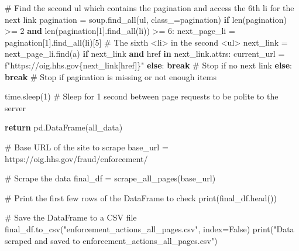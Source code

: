 \documentclass[
  letterpaper,
  DIV=11,
  numbers=noendperiod]{scrartcl}
\newenvironment{Shaded}{\begin{snugshade}}{\end{snugshade}}
\newcommand{\BuiltInTok}[1]{\textcolor[rgb]{0.00,0.23,0.31}{#1}}
\newcommand{\CommentTok}[1]{\textcolor[rgb]{0.37,0.37,0.37}{#1}}
\newcommand{\ControlFlowTok}[1]{\textcolor[rgb]{0.00,0.23,0.31}{\textbf{#1}}}
\newcommand{\DecValTok}[1]{\textcolor[rgb]{0.68,0.00,0.00}{#1}}
\newcommand{\KeywordTok}[1]{\textcolor[rgb]{0.00,0.23,0.31}{\textbf{#1}}}
\newcommand{\NormalTok}[1]{\textcolor[rgb]{0.00,0.23,0.31}{#1}}
\newcommand{\OperatorTok}[1]{\textcolor[rgb]{0.37,0.37,0.37}{#1}}
\newcommand{\SpecialCharTok}[1]{\textcolor[rgb]{0.37,0.37,0.37}{#1}}
\newcommand{\SpecialStringTok}[1]{\textcolor[rgb]{0.13,0.47,0.30}{#1}}
\newcommand{\StringTok}[1]{\textcolor[rgb]{0.13,0.47,0.30}{#1}}
\newcommand{\VariableTok}[1]{\textcolor[rgb]{0.07,0.07,0.07}{#1}}
\begin{document}
\begin{Shaded}
\begin{Highlighting}[]
        \CommentTok{\# Find the second \textquotesingle{}ul\textquotesingle{} which contains the pagination and access the 6th \textquotesingle{}li\textquotesingle{} for the next link}
\NormalTok{        pagination }\OperatorTok{=}\NormalTok{ soup.find\_all(}\StringTok{\textquotesingle{}ul\textquotesingle{}}\NormalTok{, class\_}\OperatorTok{=}\StringTok{\textquotesingle{}pagination\textquotesingle{}}\NormalTok{)}
        \ControlFlowTok{if} \BuiltInTok{len}\NormalTok{(pagination) }\OperatorTok{\textgreater{}=} \DecValTok{2} \KeywordTok{and} \BuiltInTok{len}\NormalTok{(pagination[}\DecValTok{1}\NormalTok{].find\_all(}\StringTok{\textquotesingle{}li\textquotesingle{}}\NormalTok{)) }\OperatorTok{\textgreater{}=} \DecValTok{6}\NormalTok{:}
\NormalTok{            next\_page\_li }\OperatorTok{=}\NormalTok{ pagination[}\DecValTok{1}\NormalTok{].find\_all(}\StringTok{\textquotesingle{}li\textquotesingle{}}\NormalTok{)[}\DecValTok{5}\NormalTok{]  }\CommentTok{\# The sixth \textless{}li\textgreater{} in the second \textless{}ul\textgreater{}}
\NormalTok{            next\_link }\OperatorTok{=}\NormalTok{ next\_page\_li.find(}\StringTok{\textquotesingle{}a\textquotesingle{}}\NormalTok{)}
            \ControlFlowTok{if}\NormalTok{ next\_link }\KeywordTok{and} \StringTok{\textquotesingle{}href\textquotesingle{}} \KeywordTok{in}\NormalTok{ next\_link.attrs:}
\NormalTok{                current\_url }\OperatorTok{=} \SpecialStringTok{f"https://oig.hhs.gov}\SpecialCharTok{\{}\NormalTok{next\_link[}\StringTok{\textquotesingle{}href\textquotesingle{}}\NormalTok{]}\SpecialCharTok{\}}\SpecialStringTok{"}
            \ControlFlowTok{else}\NormalTok{:}
                \ControlFlowTok{break}  \CommentTok{\# Stop if no next link}
        \ControlFlowTok{else}\NormalTok{:}
            \ControlFlowTok{break}  \CommentTok{\# Stop if pagination is missing or not enough items}

\NormalTok{        time.sleep(}\DecValTok{1}\NormalTok{)  }\CommentTok{\# Sleep for 1 second between page requests to be polite to the server}

    \ControlFlowTok{return}\NormalTok{ pd.DataFrame(all\_data)}

\CommentTok{\# Base URL of the site to scrape}
\NormalTok{base\_url }\OperatorTok{=} \StringTok{\textquotesingle{}https://oig.hhs.gov/fraud/enforcement/\textquotesingle{}}

\CommentTok{\# Scrape the data}
\NormalTok{final\_df }\OperatorTok{=}\NormalTok{ scrape\_all\_pages(base\_url)}

\CommentTok{\# Print the first few rows of the DataFrame to check}
\BuiltInTok{print}\NormalTok{(final\_df.head())}

\CommentTok{\# Save the DataFrame to a CSV file}
\NormalTok{final\_df.to\_csv(}\StringTok{"enforcement\_actions\_all\_pages.csv"}\NormalTok{, index}\OperatorTok{=}\VariableTok{False}\NormalTok{)}
\BuiltInTok{print}\NormalTok{(}\StringTok{"Data scraped and saved to enforcement\_actions\_all\_pages.csv"}\NormalTok{)}
\end{Highlighting}
\end{Shaded}
\end{document}
